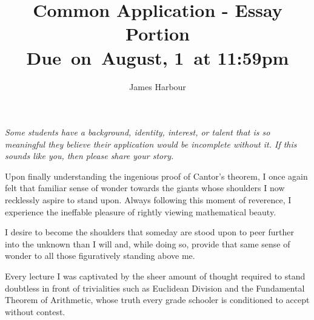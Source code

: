 \documentclass[12pt]{article}
\title{
    \vspace{2in}
    \textmd{\textbf{Common Application - Essay Portion}}\\
    \normalsize\vspace{0.1in}\small{Due\ on\  August, 1\ at 11:59pm}\\
    \vspace{3in}
}
\author{James Harbour}
\begin{document}
\maketitle
\pagebreak
 \begin{center}

   \emph{Some students have a background, identity, interest, or talent that is so meaningful they believe their application would be incomplete without it. If this sounds like you, then please share your story.}
 \end{center}
\raggedright\setlength{\parindent}{0.5in}


Upon finally understanding the ingenious proof of Cantor’s theorem, I once again felt that familiar sense of wonder towards the giants whose shoulders I now recklessly aspire to stand upon. Always following this moment of reverence, I experience the ineffable pleasure of rightly viewing mathematical beauty.

I desire to become the shoulders that someday are stood upon to peer further into the unknown than I will and, while doing so, provide that same sense of wonder to all those figuratively standing above me.

Every lecture I was captivated by the sheer amount of thought required to stand doubtless in front of trivialities such as Euclidean Division and the Fundamental Theorem of Arithmetic, whose truth every grade schooler is conditioned to accept without contest.
\end{document}
